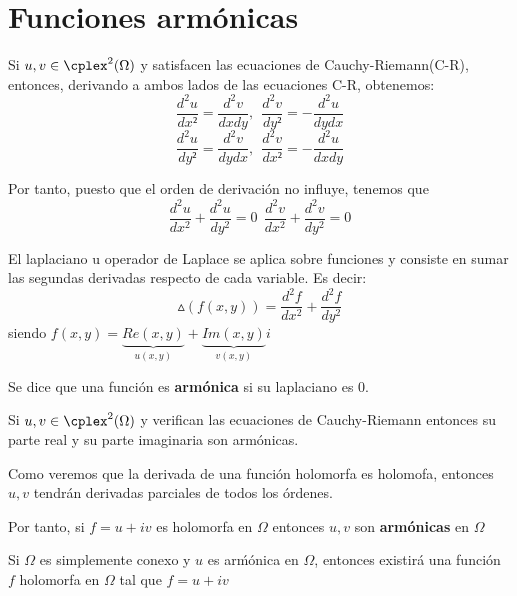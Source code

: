 \documentclass{apuntes}
\begin{document}
\section{Funciones armónicas}

Si $u,v\in \cplex^2(\Omega)$ y satisfacen las ecuaciones de Cauchy-Riemann(C-R), entonces, derivando a ambos lados de las ecuaciones C-R, obtenemos:
\[\frac{d^2u}{dx²}=\frac{d^2v}{dxdy}, \ \ \frac{d^2v}{dy²}=-\frac{d^2u}{dydx}\]
\[\frac{d^2u}{dy²}=\frac{d^2v}{dydx}, \ \ \frac{d^2v}{dx²}=-\frac{d^2u}{dxdy}\]

Por tanto, puesto que el orden de derivación no influye, tenemos que
\[\frac{d^2u}{dx^2}+\frac{d^2u}{dy^2} = 0 \ \ \frac{d^2v}{dx^2}+\frac{d^2v}{dy^2} = 0\]

\begin{defn}[Laplaciano]
El laplaciano u operador de Laplace se aplica sobre funciones y consiste en sumar las segundas derivadas respecto de cada variable. Es decir:
\[\vartriangle (f(x,y)) = \frac{d^2f}{dx^2}+\frac{d^2f}{dy^2}\]
siendo $f(x,y)=\underbrace{Re(x,y)}_{u(x,y)}+\underbrace{Im(x,y)}_{v(x,y)}i$
\end{defn}

\begin{defn}
Se dice que una función es \textbf{armónica} si su laplaciano es 0.
\end{defn}

\begin{prop}
Si $u,v \in \cplex^2(\Omega)$ y verifican las ecuaciones de Cauchy-Riemann entonces su parte real y su parte imaginaria son armónicas.
\end{prop}

Como veremos que la derivada de una función holomorfa es holomofa, entonces $u,v$ tendrán derivadas parciales de todos los órdenes.

Por tanto, si $f=u+iv$ es holomorfa en $\Omega$ entonces $u,v$ son \textbf{armónicas} en $\Omega$

\obs Si $\Omega$ es simplemente conexo y $u$ es arḿónica en $\Omega$, entonces existirá una función $f$ holomorfa en $\Omega$ tal que $f=u+iv$
\end{document}

